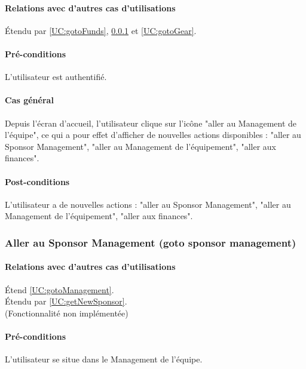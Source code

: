 \paragraph{Relations avec d'autres cas d'utilisations}
Étendu par \ref{UC:gotoFunds}, \ref{UC:gotoSponsor} et \ref{UC:gotoGear}.
\paragraph{Pré-conditions}
\begin{list}{}{\leftmargin=1.5em}
\item{L'utilisateur est authentifié.}
\end{list}
\paragraph{Cas général}
Depuis l'écran d'accueil, l'utilisateur clique sur l'icône "aller au Management de l'équipe", ce qui a pour effet d'afficher de nouvelles actions disponibles : "aller au Sponsor Management", "aller au Management de l'équipement", "aller aux finances".
\paragraph{Post-conditions}
\begin{list}{}{\leftmargin=1.5em}
\item{L'utilisateur a de nouvelles actions : "aller au Sponsor Management", "aller au Management de l'équipement", "aller aux finances".}
\end{list}

\subsubsection{Aller au Sponsor Management (goto sponsor management)}
\label{UC:gotoSponsor}
\paragraph{Relations avec d'autres cas d'utilisations}
Étend \ref{UC:gotoManagement}.\\
Étendu par \ref{UC:getNewSponsor}.
\\(Fonctionnalité non implémentée)
\paragraph{Pré-conditions}
\begin{list}{}{\leftmargin=1.5em}
\item{L'utilisateur se situe dans le Management de l'équipe.}
\end{list}
